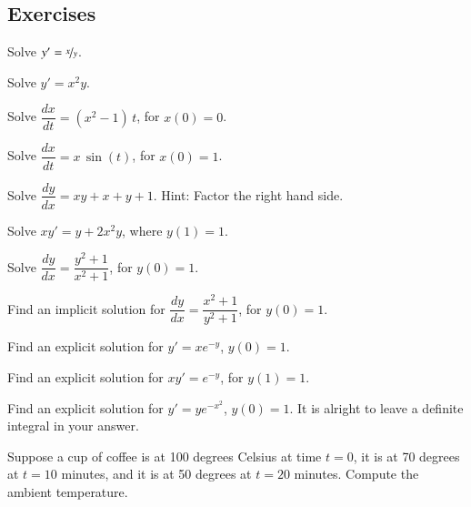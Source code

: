 \documentclass[12pt]{book}
\begin{document}
\subsection{Exercises}

\begin{exercise}
Solve $y' = \nicefrac{x}{y}$.
\end{exercise}

\begin{exercise}
Solve $y' = x^2y$.
\end{exercise}

\begin{exercise}
Solve $\dfrac{dx}{dt} = (x^2-1)\,t$, for $x(0) = 0$.
\end{exercise}

\begin{exercise}
Solve $\dfrac{dx}{dt} = x\,\sin(t)$, for $x(0) = 1$.
\end{exercise}

\begin{exercise}
Solve $\dfrac{dy}{dx} = xy+x+y+1$.  Hint: Factor the right hand side.
\end{exercise}

\begin{exercise}
Solve $xy' = y + 2x^2 y$, where $y(1) = 1$.
\end{exercise}

\begin{exercise}
Solve $\dfrac{dy}{dx} = \dfrac{y^2+1}{x^2+1}$, for $y(0) = 1$.
\end{exercise}

\begin{exercise}
Find an implicit solution for
$\dfrac{dy}{dx} = \dfrac{x^2+1}{y^2+1}$, for $y(0) = 1$.
\end{exercise}

\begin{exercise}
Find an explicit solution for $y' = xe^{-y}$, $y(0)=1$.
\end{exercise}

\begin{exercise}
Find an explicit solution for $xy' = e^{-y}$, for $y(1)=1$.
\end{exercise}

\begin{exercise}
Find an explicit solution for $y' = ye^{-x^2}$, $y(0)=1$.  It is alright to
leave a definite integral in your answer.
\end{exercise}

\begin{exercise}
Suppose a cup of coffee is at 100 degrees Celsius at time $t=0$,
it is at 70 degrees at $t=10$ minutes, and it is at 50 degrees at $t=20$
minutes.  Compute the ambient temperature.
\end{exercise}
\end{document}

